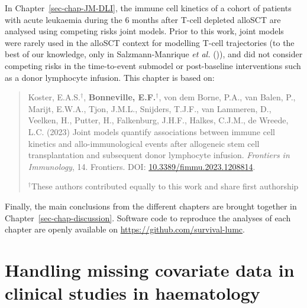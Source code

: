 \documentclass[
  letterpaper,
  DIV=11,
  numbers=noendperiod]{scrreprt}
\begin{document}
In Chapter~\ref{sec-chap-JM-DLI}, the immune cell kinetics of a cohort
of patients with acute leukaemia during the 6 months after T-cell
depleted alloSCT are analysed using competing risks joint models. Prior
to this work, joint models were rarely used in the alloSCT context for
modelling T-cell trajectories (to the best of our knowledge, only in
Salzmann-Manrique \emph{et al.}
()), and
did not consider competing risks in the time-to-event submodel or
post-baseline interventions such as a donor lymphocyte infusion. This
chapter is based on:

\begin{quote}
Koster, E.A.S.\(^\dagger\), \textbf{Bonneville, E.F.}\(^\dagger\), von
dem Borne, P.A., van Balen, P., Marijt, E.W.A., Tjon, J.M.L., Snijders,
T.J.F., van Lammeren, D., Veelken, H., Putter, H., Falkenburg, J.H.F.,
Halkes, C.J.M., de Wreede, L.C. (2023) Joint models quantify
associations between immune cell kinetics and allo-immunological events
after allogeneic stem cell transplantation and subsequent donor
lymphocyte infusion. \emph{Frontiers in Immunology}, 14. Frontiers. DOI:
\href{https://doi.org/10.3389/fimmu.2023.1208814}{10.3389/fimmu.2023.1208814}.

\(^\dagger\)These authors contributed equally to this work and share
first authorship
\end{quote}

Finally, the main conclusions from the different chapters are brought
together in Chapter~\ref{sec-chap-discussion}. Software code to
reproduce the analyses of each chapter are openly available on
\url{https://github.com/survival-lumc}.


\chapter{Handling missing covariate data in clinical studies in
haematology}\label{sec-chap-haema-review}
\end{document}
